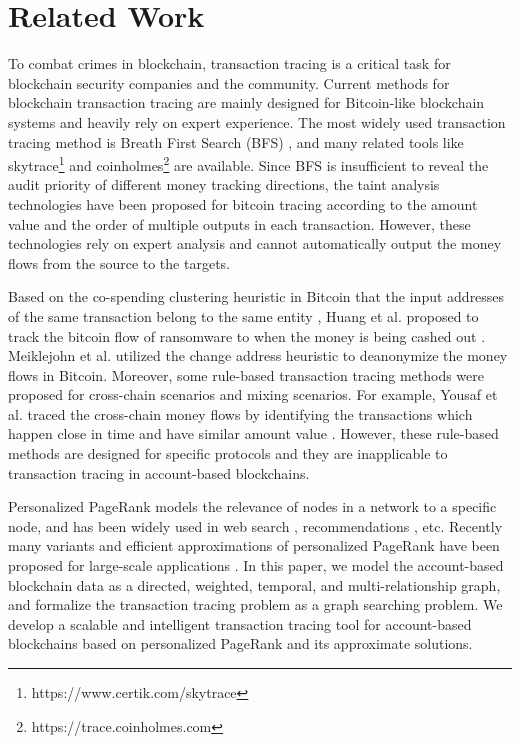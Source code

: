 \section{Related Work}
To combat crimes in blockchain, transaction tracing is a critical task for blockchain security companies and the community. Current methods for blockchain transaction tracing are mainly designed for Bitcoin-like blockchain systems and heavily rely on expert experience. The most widely used transaction tracing method is Breath First Search (BFS) \cite{zhao2015graph,phetsouvanh2018egret}, and many related tools like skytrace\footnote{https://www.certik.com/skytrace} and coinholmes\footnote{https://trace.coinholmes.com} are available. Since BFS is insufficient to reveal the audit priority of different money tracking directions, the taint analysis technologies \cite{moser2014towards,tironsakkul2019probing,di2015bitconeview} have been proposed for bitcoin tracing according to the amount value and the order of multiple outputs in each transaction. However, these technologies rely on expert analysis and cannot automatically output the money flows from the source to the targets.

Based on the co-spending clustering heuristic in Bitcoin that the input addresses of the same transaction belong to the same entity \cite{Reid2013}, Huang et al. proposed to track the bitcoin flow of ransomware to when the money is being cashed out \cite{HuangTracking2018}.
Meiklejohn et al. \cite{meiklejohn2013fistful} utilized the change address heuristic to deanonymize the money flows in Bitcoin.
Moreover, some rule-based transaction tracing methods were proposed for cross-chain scenarios and mixing scenarios. For example, Yousaf et al. traced the cross-chain money flows by identifying the transactions which happen close in time and have similar amount value \cite{yousaf2019tracing}. 
However, these rule-based methods are designed for specific protocols and they are inapplicable to transaction tracing in account-based blockchains.

Personalized PageRank models the relevance of nodes in a network to a specific node, and has been widely used in web search \cite{page1999pagerank}, recommendations \cite{WTFGupta2013}, etc. Recently many variants and efficient approximations of personalized PageRank have been proposed for large-scale applications \cite{bojchevski2020scaling}. In this paper, we model the account-based blockchain data as a directed, weighted, temporal, and multi-relationship graph, and formalize the transaction tracing problem as a graph searching problem. We develop a scalable and intelligent transaction tracing tool for account-based blockchains based on personalized PageRank and its approximate solutions.